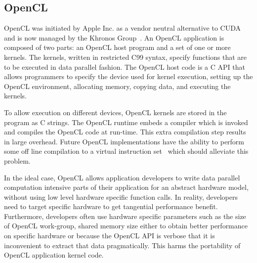 
\subsection{OpenCL}

OpenCL was initiated by Apple Inc. as a vendor neutral alternative
to CUDA and is now managed by the Khronos Group~\cite{OpenCL_kh}.
An OpenCL application is composed of two parts: an OpenCL host program and a
set of one or more kernels. The kernels, written in restricted C99 syntax,
specify functions that are to be executed in data parallel fashion. The OpenCL 
host code is a C API that allows programmers to specify the device used for
kernel execution, setting up the OpenCL environment, allocating memory, copying
data, and executing the kernels.

To allow execution on different devices, OpenCL kernels are stored in
	the program as C strings.
The OpenCL runtime embeds a compiler which is invoked and compiles the OpenCL code at run-time.
This extra compilation step results in large overhead. Future OpenCL implementations
 have the ability to perform some off line compilation to a virtual instruction
set~\cite{SPIR} which should alleviate this problem.

In the ideal case, OpenCL allows application developers to write
data parallel computation intensive parts of their application for an abstract
hardware model, without using low level hardware specific function calls.
In reality, developers need to target specific hardware to get tangential
performance benefit. Furthermore, developers often use hardware specific 
parameters such as the size of OpenCL work-group, shared memory size either 
to obtain better performance on specific hardware or because the OpenCL API
is verbose that it is inconvenient to extract that data pragmatically.
This harms the portability of OpenCL application kernel code.

